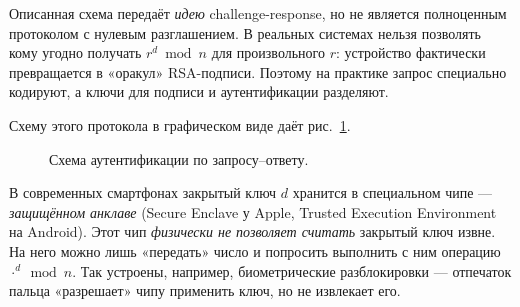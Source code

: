 \begin{importantbox}[title={Важно: это учебная иллюстрация}]
Описанная схема передаёт \emph{идею} challenge-response, но не является полноценным протоколом с нулевым разглашением. В реальных системах нельзя позволять кому угодно получать $r^{d} \bmod n$ для произвольного $r$: устройство фактически превращается в «оракул» RSA-подписи. Поэтому на практике запрос специально кодируют, а ключи для подписи и аутентификации разделяют.
\end{importantbox}

Схему этого протокола в графическом виде даёт рис.~\ref{fig:p4-1}.

\begin{figure}[H]
\centering
{}
\caption{Схема аутентификации по запросу--ответу.}
\label{fig:p4-1}
\end{figure}

\begin{interestbox}[title={Это интересно: «запомни всё, чтобы ничего не помнить»}]
В современных смартфонах закрытый ключ $d$ хранится в специальном чипе --- \emph{защищённом анклаве} (Secure Enclave у Apple, Trusted Execution Environment на Android). Этот чип \emph{физически не позволяет считать} закрытый ключ извне. На него можно лишь «передать» число и попросить выполнить с ним операцию $\cdot^d \bmod n$. Так устроены, например, биометрические разблокировки --- отпечаток пальца «разрешает» чипу применить ключ, но не извлекает его.
\end{interestbox}

